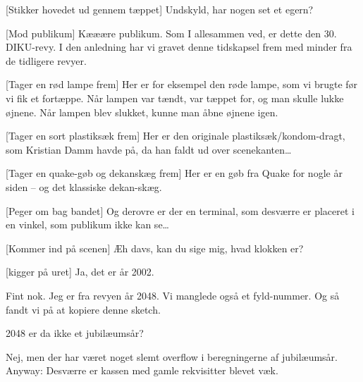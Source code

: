 \documentclass[a4paper,11pt]{article}
\begin{document}
\begin{sketch}
  

  
  [Stikker hovedet ud gennem tæppet] Undskyld, har nogen set et egern?
  
  
   [Mod publikum] Kææære publikum. Som I allesammen ved, er
  dette den 30. DIKU-revy. I den anledning har vi gravet denne
  tidskapsel frem med minder fra de tidligere revyer.
  
  [Tager en rød lampe frem] Her er for eksempel den røde lampe, som
  vi brugte før vi fik et fortæppe. Når lampen var tændt, var tæppet for, og
  man skulle lukke øjnene. Når lampen blev slukket, kunne man åbne øjnene
  igen.

  [Tager en sort plastiksæk frem] Her er den originale
  plastiksæk/kondom-dragt, som Kristian Damm havde på, da han faldt ud over
  scenekanten\ldots
  
  [Tager en quake-gøb og dekanskæg frem] Her er en gøb fra Quake for nogle år
  siden -- og det klassiske dekan-skæg.

  [Peger om bag bandet] Og derovre er der en terminal, som desværre
  er placeret i en vinkel, som publikum ikke kan se\ldots
   
  


  
   [Kommer ind på scenen] Æh davs, kan du sige mig, hvad
  klokken er?
  
   [kigger på uret] Ja, det er år 2002.
  
   Fint nok. Jeg er fra revyen år 2048. Vi manglede også et
  fyld-nummer. Og så fandt vi på at kopiere denne sketch.
  
   2048 er da ikke et jubilæumsår?
  
   Nej, men der har været noget slemt overflow i
  beregningerne af jubilæumsår. Anyway: Desværre er kassen med gamle
  rekvisitter blevet væk.
  

\end{sketch}
\end{document}
